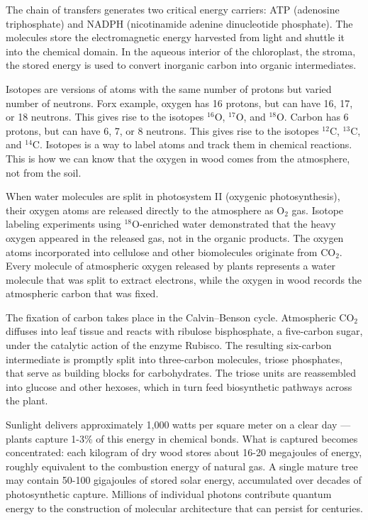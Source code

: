 The chain of transfers generates two critical energy carriers: ATP (adenosine triphosphate) and NADPH (nicotinamide adenine dinucleotide phosphate). The molecules store the electromagnetic energy harvested from light and shuttle it into the chemical domain. In the aqueous interior of the chloroplast, the stroma, the stored energy is used to convert inorganic carbon into organic intermediates.

Isotopes are versions of atoms with the same number of protons but varied number of neutrons. Forx example, oxygen has 16 protons, but can have 16, 17, or 18 neutrons. This gives rise to the isotopes $^{16}\mathrm{O}$, $^{17}\mathrm{O}$, and $^{18}\mathrm{O}$. Carbon has 6 protons, but can have 6, 7, or 8 neutrons. This gives rise to the isotopes $^{12}\mathrm{C}$, $^{13}\mathrm{C}$, and $^{14}\mathrm{C}$. Isotopes is a way to label atoms and track them in chemical reactions. This is how we can know that the oxygen in wood comes from the atmosphere, not from the soil.

When water molecules are split in photosystem II (oxygenic photosynthesis), their oxygen atoms are released directly to the atmosphere as \(\mathrm{O}_2\) gas. Isotope labeling experiments using $^{18}\mathrm{O}$-enriched water demonstrated that the heavy oxygen appeared in the released gas, not in the organic products. The oxygen atoms incorporated into cellulose and other biomolecules originate from \(\mathrm{CO}_2\). Every molecule of atmospheric oxygen released by plants represents a water molecule that was split to extract electrons, while the oxygen in wood records the atmospheric carbon that was fixed.

The fixation of carbon takes place in the Calvin–Benson cycle. Atmospheric \(\mathrm{CO}_2\) diffuses into leaf tissue and reacts with ribulose bisphosphate, a five-carbon sugar, under the catalytic action of the enzyme Rubisco. The resulting six-carbon intermediate is promptly split into three-carbon molecules, triose phosphates, that serve as building blocks for carbohydrates. The triose units are reassembled into glucose and other hexoses, which in turn feed biosynthetic pathways across the plant.

Sunlight delivers approximately 1,000 watts per square meter on a clear day — plants capture 1-3\% of this energy in chemical bonds. What is captured becomes concentrated: each kilogram of dry wood stores about 16-20 megajoules of energy, roughly equivalent to the combustion energy of natural gas. A single mature tree may contain 50-100 gigajoules of stored solar energy, accumulated over decades of photosynthetic capture. Millions of individual photons contribute quantum energy to the construction of molecular architecture that can persist for centuries.

